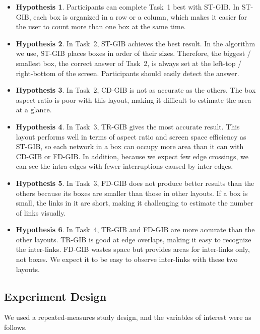 \documentclass[review]{vgtc}                 %
\begin{document}
\begin{itemize}
\item {\bf Hypothesis 1}. Participants can complete Task~1 best with ST-GIB.
In ST-GIB, each box is organized in a row or a column, which makes it easier for the user to count more than one box at the same time.

\item {\bf Hypothesis 2}. In Task~2, ST-GIB achieves the best result.
In the algorithm we use, ST-GIB places boxes in order of their sizes. Therefore, the biggest / smallest box, the correct answer of Task~2, is always set at the left-top / right-bottom of the screen.
Participants should easily detect the answer.

\item {\bf Hypothesis 3}. In Task~2, CD-GIB is not as accurate as the others.
The box aspect ratio is poor with this layout, making it difficult to estimate the area at a glance.

\item {\bf Hypothesis 4}. In Task~3, TR-GIB gives the most accurate result.
This layout performs well in terms of aspect ratio and screen space efficiency as ST-GIB, so each network in a box can occupy more area than it can with CD-GIB or FD-GIB.
In addition, because we expect few edge crossings, we can see the intra-edges with fewer interruptions caused by inter-edges.

\item {\bf Hypothesis 5}. In Task~3, FD-GIB does not produce better results than the others because its boxes are smaller than those in other layouts.
If a box is small, the links in it are short, making it challenging to estimate the number of links visually.

\item {\bf Hypothesis 6}. In Task~4, TR-GIB and FD-GIB are more accurate than the other layouts.
TR-GIB is good at edge overlaps, making it easy to recognize the inter-links.
FD-GIB wastes space but provides areas for inter-links only, not boxes.
We expect it to be easy to observe inter-links with these two layouts.
\end{itemize}

\subsection{Experiment Design}

We used a repeated-measures study design, and the variables of interest were as follows.
\end{document}
